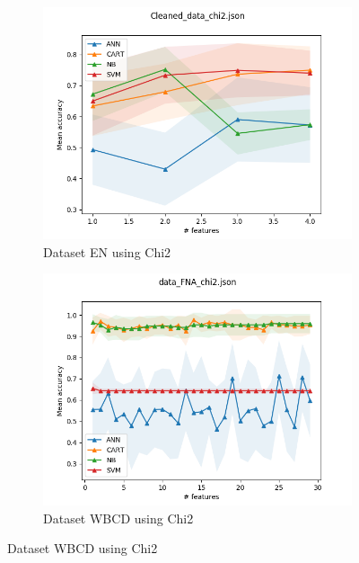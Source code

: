 \begin{figure}[htbp!]
  \centering
  \begin{subfigure}[b]{0.475\textwidth}
      \centering
      \includegraphics[width=\textwidth]{../plots_with_std_fill/Cleaned_data_chi2_combined.png}
      \caption[]%
      {{\small Dataset EN using Chi2}}
      \label{fig:EN_chi2}
  \end{subfigure}
  \hfill
  \begin{subfigure}[b]{0.475\textwidth}
      \centering
      \includegraphics[width=\textwidth]{../plots_with_std_fill/data_FNA_chi2_combined.png}
      \caption[]%
      {{\small Dataset WBCD using Chi2}}
      \label{fig:WBCD_chi2}
  \end{subfigure}

\end{figure}
